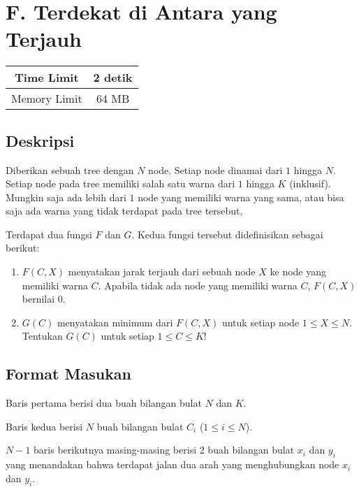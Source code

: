 \documentclass{article}
\begin{document}
\section*{\hfil F. Terdekat di Antara yang Terjauh\hfil}

\begin{center}
\begin{tabular}{ |cc| } 
 \hline
 Time Limit & 2 detik \\ 
 \hline
 Memory Limit & 64 MB \\
 \hline
\end{tabular}
\end{center}

\subsection*{Deskripsi}
\par\noindent
Diberikan sebuah tree dengan $N$ node. Setiap node dinamai dari $1$ hingga $N$. Setiap node pada tree memiliki salah satu warna dari $1$ hingga $K$ (inklusif). Mungkin saja ada lebih dari $1$ node yang memiliki warna yang sama, atau bisa saja ada warna yang tidak terdapat pada tree tersebut. 
\newline\par\noindent
Terdapat dua fungsi $F$ dan $G$. Kedua fungsi tersebut didefinisikan sebagai berikut:
\begin{enumerate}
\item $F(C, X)$ menyatakan jarak terjauh dari sebuah node $X$ ke node yang memiliki warna $C$. Apabila tidak ada node yang memiliki warna $C$, $F(C, X)$ bernilai $0$.
\item $G(C)$ menyatakan minimum dari $F(C, X)$ untuk setiap node $1 \leq X \leq N$. Tentukan $G(C)$ untuk setiap $1 \leq C \leq K$!
\end{enumerate}

\subsection*{Format Masukan}
\par\noindent
Baris pertama berisi dua buah bilangan bulat $N$ dan $K$.
\newline\par\noindent
Baris kedua berisi $N$ buah bilangan bulat $C_i$ ($1 \leq i \leq N$).
\newline\par\noindent
$N - 1$ baris berikutnya masing-masing berisi 2 buah bilangan bulat $x_i$ dan $y_i$ yang menandakan bahwa terdapat jalan dua arah yang menghubungkan node $x_i$ dan $y_i$.
\end{document}
